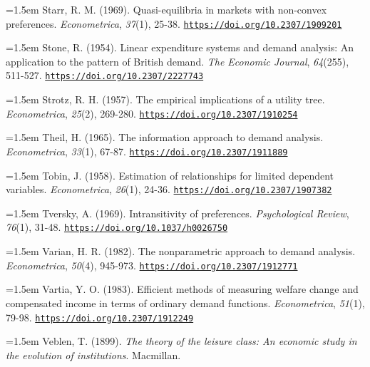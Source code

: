 \documentclass[10pt,a4paper]{article}
\begin{document}
\noindent\hangindent=1.5em Starr, R. M. (1969). Quasi-equilibria in markets with non-convex preferences. \textit{Econometrica}, \textit{37}(1), 25-38. \href{https://doi.org/10.2307/1909201}{\nolinkurl{https://doi.org/10.2307/1909201}}

\noindent\hangindent=1.5em Stone, R. (1954). Linear expenditure systems and demand analysis: An application to the pattern of British demand. \textit{The Economic Journal}, \textit{64}(255), 511-527. \href{https://doi.org/10.2307/2227743}{\nolinkurl{https://doi.org/10.2307/2227743}}

\noindent\hangindent=1.5em Strotz, R. H. (1957). The empirical implications of a utility tree. \textit{Econometrica}, \textit{25}(2), 269-280. \href{https://doi.org/10.2307/1910254}{\nolinkurl{https://doi.org/10.2307/1910254}}

\noindent\hangindent=1.5em Theil, H. (1965). The information approach to demand analysis. \textit{Econometrica}, \textit{33}(1), 67-87. \href{https://doi.org/10.2307/1911889}{\nolinkurl{https://doi.org/10.2307/1911889}}

\noindent\hangindent=1.5em Tobin, J. (1958). Estimation of relationships for limited dependent variables. \textit{Econometrica}, \textit{26}(1), 24-36. \href{https://doi.org/10.2307/1907382}{\nolinkurl{https://doi.org/10.2307/1907382}}

{\sloppy\noindent\hangindent=1.5em Tversky, A. (1969). Intransitivity of preferences. \textit{Psychological Review}, \textit{76}(1), 31-48. \href{https://doi.org/10.1037/h0026750}{\nolinkurl{https://doi.org/10.1037/h0026750}}\par}

\noindent\hangindent=1.5em Varian, H. R. (1982). The nonparametric approach to demand analysis. \textit{Econometrica}, \textit{50}(4), 945-973. \href{https://doi.org/10.2307/1912771}{\nolinkurl{https://doi.org/10.2307/1912771}}

\noindent\hangindent=1.5em Vartia, Y. O. (1983). Efficient methods of measuring welfare change and compensated income in terms of ordinary demand functions. \textit{Econometrica}, \textit{51}(1), 79-98. \href{https://doi.org/10.2307/1912249}{\nolinkurl{https://doi.org/10.2307/1912249}}

\noindent\hangindent=1.5em Veblen, T. (1899). \textit{The theory of the leisure class: An economic study in the evolution of institutions}. Macmillan.
\end{document}
